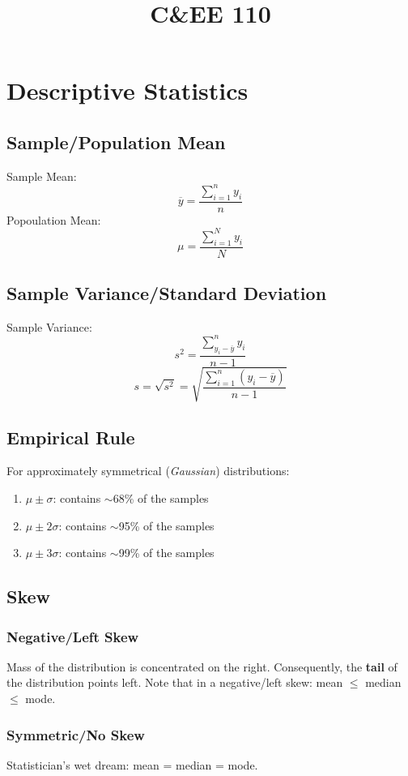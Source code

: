 \documentclass[13pt]{article}
\title{C\&EE 110}
\date{}
\begin{document}
\maketitle
\tableofcontents

\newpage
\section{Descriptive Statistics}
\subsection{Sample/Population Mean}
Sample Mean:
\[\overline{y} = \frac{\sum_{i = 1}^{n} y_{i}}{n}\]
Popoulation Mean:
\[\mu = \frac{\sum_{i = 1}^{N} y_{i}}{N}\]

\subsection{Sample Variance/Standard Deviation}
Sample Variance:
\[s^{2} = \frac{\sum_{y_{i} - \overline{y}}^{n} y_{i}}{n - 1}\]
\[s = \sqrt{s^{2}} = \sqrt{\frac{\sum_{i = 1}^{n} (y_{i} -
      \overline{y})}{n - 1}}\]

\subsection{Empirical Rule}
For approximately symmetrical (\textit{Gaussian}) distributions:
\begin{enumerate}[label=(\roman*)]
\item $\mu \pm \sigma$: contains $\sim$68\% of the samples
\item $\mu \pm 2\sigma$: contains $\sim$95\% of the samples
\item $\mu \pm 3\sigma$: contains $\sim$99\% of the samples
\end{enumerate}

\subsection{Skew}
\subsubsection{Negative/Left Skew}
Mass of the distribution is concentrated on the right. Consequently,
the \textbf{tail} of the distribution points left. Note that in a negative/left
skew: mean $\leq$ median $\leq$ mode.

\subsubsection{Symmetric/No Skew}
Statistician's wet dream: mean = median = mode.
\end{document}
